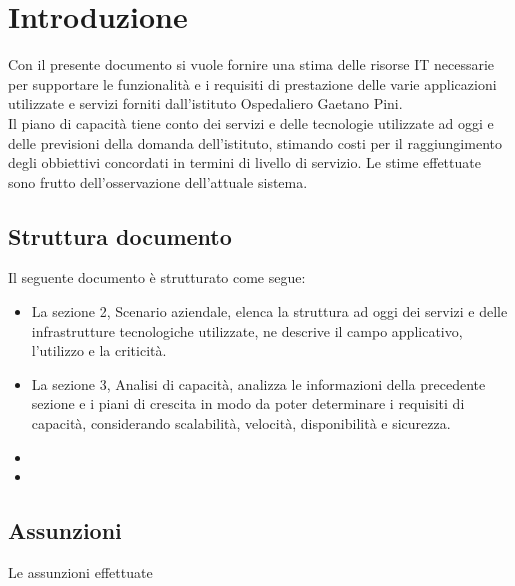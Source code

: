 \newpage

\section{Introduzione}
	Con il presente documento si vuole fornire una stima delle risorse IT necessarie per supportare le funzionalità e i requisiti di prestazione delle varie applicazioni utilizzate e servizi forniti dall'istituto  Ospedaliero Gaetano Pini.\\
	Il piano di capacità tiene conto dei servizi e delle tecnologie utilizzate ad oggi e delle previsioni della domanda dell'istituto, stimando costi per il raggiungimento degli obbiettivi concordati in termini di livello di servizio.
	Le stime effettuate sono frutto dell'osservazione dell'attuale sistema.
	
	\subsection{Struttura documento}
	Il seguente documento è strutturato come segue:
	\begin{itemize}
		\item La sezione 2, Scenario aziendale, elenca la struttura ad oggi dei servizi e delle infrastrutture tecnologiche utilizzate, ne descrive il campo applicativo, l'utilizzo e la criticità.
		\item La sezione 3, Analisi di capacità, analizza le informazioni della precedente sezione e i piani di crescita in modo da poter determinare i requisiti di capacità, considerando scalabilità, velocità, disponibilità e sicurezza.
		\item 
		\item
	\end{itemize}
	
	\subsection{Assunzioni}
	Le assunzioni effettuate 